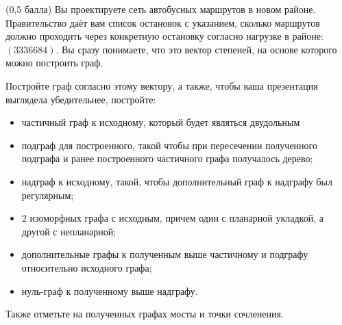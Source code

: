 \question
(0,5 балла) Вы проектируете сеть автобусных маршрутов в новом районе. Правительство даёт вам список остановок с указанием, сколько маршрутов должно проходить через конкретную остановку согласно нагрузке в районе: $(3 3 3 6 6 8 4)$. Вы сразу понимаете, что это вектор степеней, на основе которого можно построить граф.

Постройте граф согласно этому вектору, а также, чтобы ваша презентация выглядела убедительнее, постройте:

\begin{itemize}
\item частичный граф к исходному, который будет являться двудольным
\item подграф для построенного, такой чтобы при пересечении полученного подграфа и ранее построенного частичного графа получалось дерево;
\item надграф к исходному, такой, чтобы дополнительный граф к надграфу был регулярным;
\item 2 изоморфных графа с исходным, причем один с планарной укладкой, а другой с непланарной;
\item дополнительные графы к полученным выше частичному и подграфу относительно исходного графа;
\item нуль-граф к полученному выше надграфу.
\end{itemize}

Также отметьте на полученных графах мосты и точки сочленения.
